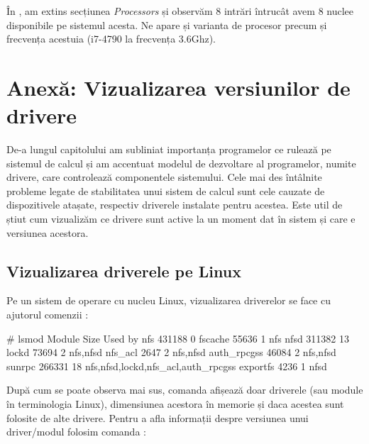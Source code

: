 În , am extins secțiunea
\textit{Processors} și observăm 8 intrări întrucât avem 8 nuclee disponibile pe
sistemul acesta. Ne apare și varianta de procesor precum și frecvența acestuia
(i7-4790 la frecvența 3.6Ghz).

\section{Anexă: Vizualizarea versiunilor de drivere}
\label{sec:hardware-virtualizare-driver}

De-a lungul capitolului am subliniat importanța programelor ce rulează pe
sistemul de calcul și am accentuat modelul de dezvoltare al programelor, numite
drivere, care controlează componentele sistemului. Cele mai des întâlnite
probleme legate de stabilitatea unui sistem de calcul sunt cele cauzate de
dispozitivele atașate, respectiv driverele instalate pentru acestea. Este util
de știut cum vizualizăm ce drivere sunt active la un moment dat în sistem și
care e versiunea acestora.

\subsection{Vizualizarea driverele pe Linux}
\label{sec:hardware-virtualizare-linux}

Pe un sistem de operare cu nucleu Linux, vizualizarea driverelor se face cu
ajutorul comenzii :

\begin{screen}
# lsmod
Module                  Size  Used by
nfs                   431188  0
fscache                55636  1 nfs
nfsd                  311382  13
lockd                  73694  2 nfs,nfsd
nfs_acl                 2647  2 nfs,nfsd
auth_rpcgss            46084  2 nfs,nfsd
sunrpc                266331  18 nfs,nfsd,lockd,nfs_acl,auth_rpcgss
exportfs                4236  1 nfsd
\end{screen}


După cum se poate observa mai sus, comanda  afișează doar driverele (sau
module în terminologia Linux), dimensiunea acestora în memorie și daca acestea
sunt folosite de alte drivere. Pentru a afla informații despre versiunea unui
driver/modul folosim comanda :

